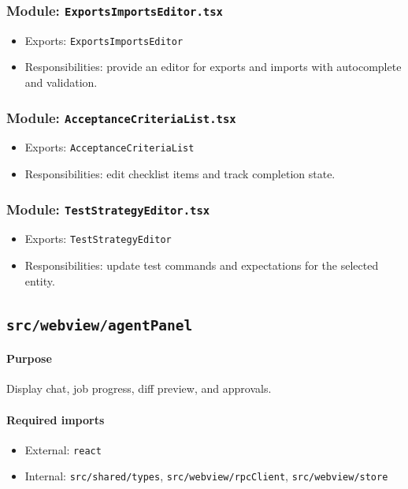 \documentclass[11pt]{article}
\begin{document}
\subsubsection*{Module: \texttt{ExportsImportsEditor.tsx}}
\begin{itemize}[noitemsep]
  \item Exports: \texttt{ExportsImportsEditor}
  \item Responsibilities: provide an editor for exports and imports with autocomplete and validation.
\end{itemize}

\subsubsection*{Module: \texttt{AcceptanceCriteriaList.tsx}}
\begin{itemize}[noitemsep]
  \item Exports: \texttt{AcceptanceCriteriaList}
  \item Responsibilities: edit checklist items and track completion state.
\end{itemize}

\subsubsection*{Module: \texttt{TestStrategyEditor.tsx}}
\begin{itemize}[noitemsep]
  \item Exports: \texttt{TestStrategyEditor}
  \item Responsibilities: update test commands and expectations for the selected entity.
\end{itemize}

\subsection{\texttt{src/webview/agentPanel}}
\paragraph{Purpose} Display chat, job progress, diff preview, and approvals.

\paragraph{Required imports}
\begin{itemize}[noitemsep]
  \item External: \texttt{react}
  \item Internal: \texttt{src/shared/types}, \texttt{src/webview/rpcClient}, \texttt{src/webview/store}
\end{itemize}
\end{document}

